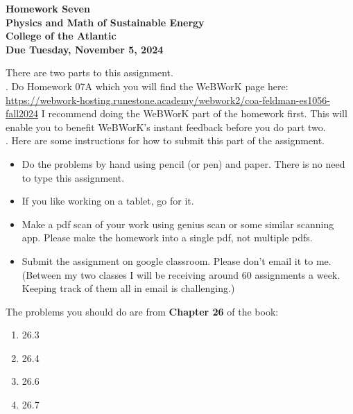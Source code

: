 \documentclass[12pt]{article}
\begin{document}
\pagestyle{empty}
 
\begin{center}
{\LARGE {\bf Homework Seven}}\\
\bigskip
{\Large {\bf Physics and Math of Sustainable Energy}}\\
\bigskip
{\Large {\bf College of the Atlantic}}\\
\bigskip
{ {\bf Due Tuesday, November 5, 2024}}\\ 
\end{center}
\medskip


\noindent There are two parts to this assignment.\\

.  Do Homework 07A which you
will find the WeBWorK page here:
\url{https://webwork-hosting.runestone.academy/webwork2/coa-feldman-es1056-fall2024}
I recommend doing the WeBWorK part of the homework first.  This will
enable you to benefit WeBWorK's instant feedback before you do part
two.\\ 


.  Here are some
instructions for how to submit this part of the assignment.
\begin{itemize}
\item Do the problems by hand using pencil (or pen) and paper.
  There is no need to type this assignment.
\item If you like working on a tablet, go for it. 
\item Make a pdf scan of your work using genius scan or some
  similar scanning app.  Please make the homework into a single
  pdf, not multiple pdfs.
\item Submit the assignment on google classroom.  Please don't
  email it to me.  (Between my two classes I will be receiving
  around 60 assignments a week.  Keeping track of them all in email 
  is challenging.)\\
\end{itemize}



\noindent The problems you should do are from {\bf Chapter 26} of the book:  \\ 

\begin{enumerate}
  \setlength{\itemsep}{-1mm}
\item 26.3
\item 26.4
\item 26.6
\item 26.7
\end{enumerate}
\end{document}
